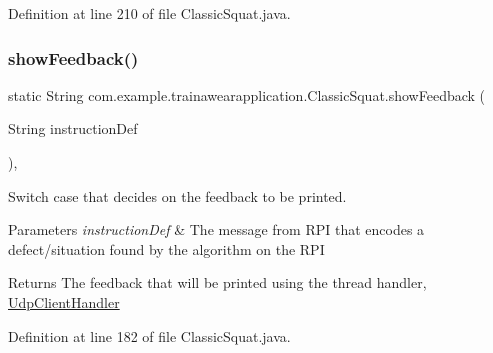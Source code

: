 Definition at line 210 of file Classic\+Squat.\+java.


\begin{DoxyCode}{0}

\end{DoxyCode}
\mbox{\label{classcom_1_1example_1_1trainawearapplication_1_1_classic_squat_a1904cfcfcc9d0e3f1256202a8f7ad33e}} 
\subsubsection{\texorpdfstring{showFeedback()}{showFeedback()}}
{\footnotesize\ttfamily static String com.\+example.\+trainawearapplication.\+Classic\+Squat.\+show\+Feedback (\begin{DoxyParamCaption}\item[{String}]{instruction\+Def }\end{DoxyParamCaption})\hspace{0.3cm}{\ttfamily [inline]}, {\ttfamily [static]}}



Switch case that decides on the feedback to be printed. 


\begin{DoxyParams}{Parameters}
{\em instruction\+Def} & The message from R\+PI that encodes a defect/situation found by the algorithm on the R\+PI \\
\hline
\end{DoxyParams}
\begin{DoxyReturn}{Returns}
The feedback that will be printed using the thread handler, \mbox{\hyperlink{classcom_1_1example_1_1trainawearapplication_1_1_udp_client_handler}{Udp\+Client\+Handler}} 
\end{DoxyReturn}


Definition at line 182 of file Classic\+Squat.\+java.


